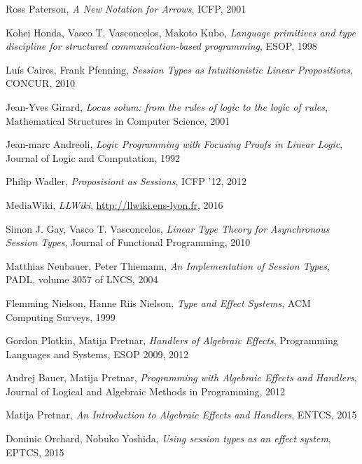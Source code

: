 \documentclass{article}
\begin{document}
\begin{thebibliography}{99}
    Ross Paterson,
    \emph{A New Notation for Arrows},
    ICFP,
    2001

    Kohei Honda, Vasco T. Vasconcelos, Makoto Kubo,
    \emph{Language primitives and type discipline for structured
      communication-based programming},
    ESOP,
    1998

    Lu\'is Caires, Frank Pfenning,
    \emph{Session Types as Intuitionistic Linear Propositions},
    CONCUR,
    2010

    Jean-Yves Girard,
    \emph{Locus solum: from the rules of logic to the logic of rules},
    Mathematical Structures in Computer Science,
    2001

    Jean-marc Andreoli,
    \emph{Logic Programming with Focusing Proofs in Linear Logic},
    Journal of Logic and Computation,
    1992

    Philip Wadler,
    \emph{Proposisiont as Sessions},
    ICFP '12,
    2012

    MediaWiki,
    \emph{LLWiki},
    \url{http://llwiki.ens-lyon.fr},
    2016

    Simon J. Gay, Vasco T. Vasconcelos,
    \emph{Linear Type Theory for Asynchronous Session Types},
    Journal of Functional Programming,
    2010

    Matthias Neubauer, Peter Thiemann,
    \emph{An Implementation of Session Types},
    PADL, volume 3057 of LNCS,
    2004

    Flemming Nielson, Hanne Riis Nielson,
    \emph{Type and Effect Systems},
    ACM Computing Surveys,
    1999

    Gordon Plotkin, Matija Pretnar,
    \emph{Handlers of Algebraic Effects},
    Programming Languages and Systems, ESOP 2009,
    2012

    Andrej Bauer, Matija Pretnar,
    \emph{Programming with Algebraic Effects and Handlers},
    Journal of Logical and Algebraic Methods in Programming,
    2012

    Matija Pretnar,
    \emph{An Introduction to Algebraic Effects and Handlers},
    ENTCS,
    2015

    Dominic Orchard, Nobuko Yoshida,
    \emph{Using session types as an effect system},
    EPTCS,
    2015

\end{thebibliography}

\end{document}
